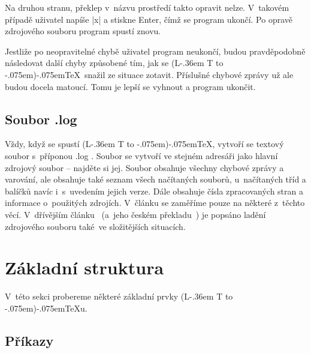 \documentclass{csbulletin}
\makeatletter
\def\soub#1{{\sffamily
  \tmphc\hyphenchar\font
  \hyphenchar\font-1 #1%
  \hyphenchar\font\tmphc}}
\DeclareRobustCommand{\La}{L\kern-.36em%
        {\sbox\z@ T%
         \vbox to\ht\z@{\hbox{\check@mathfonts
                              \fontsize\sf@size\z@
                              \math@fontsfalse\selectfont
                              A}%
                        \vss}%
        }}
\def\AllTeX{(\La\kern-.075em)\kern-.075em\TeX}
\makeatother
\begin{document}
Na druhou stranu, překlep v~názvu prostředí takto opravit nelze. V~takovém případě uživatel napíše |x| a stiskne Enter, čímž se program ukončí. Po opravě zdrojového souboru program spustí znovu.

Jestliže po neopravitelné chybě uživatel program neukončí, budou pravděpodobně následovat další chyby způsobené tím, jak se \AllTeX\ snažil ze situace zotavit. Příslušné chybové zprávy už ale budou docela matoucí. Tomu je lepší se vyhnout a program ukončit.

\subsection{Soubor \soub{.log}}

Vždy, když se spustí \AllTeX, vytvoří se textový soubor s~příponou \soub{.log}. Soubor se vytvoří ve stejném adresáři jako hlavní zdrojový soubor -- najděte si jej. Soubor obsahuje všechny chybové zprávy a varování, ale obsahuje také seznam všech načítaných souborů, u~načítaných tříd a balíčků navíc i~s~uvedením jejich verze. Dále obsahuje čísla zpracovaných stran a informace o~použitých zdrojích. V~článku se zaměříme pouze na některé z~těchto věcí. V~dřívějším článku~\cite{debug} (a~jeho českém překladu~\cite{debugCZ}) je popsáno ladění zdrojového souboru také~ve složitějších situacích.


%
%

\section{Základní struktura}

V~této sekci probereme některé základní prvky \AllTeX u.

\subsection{Příkazy}
\end{document}

